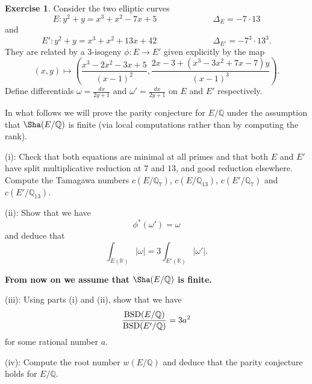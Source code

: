 \documentclass[12pt]{amsart}
\numberwithin{equation}{section}
\theoremstyle{remark}
\theoremstyle{definition}
\theoremstyle{definition}
\theoremstyle{definition}
\theoremstyle{definition}
\theoremstyle{definition}
\theoremstyle{definition}
\newtheorem{exercise}[equation]{Exercise}
\theoremstyle{definition}
\begin{document}
\begin{exercise}
Consider the two elliptic curves
\[E:y^2+y=x^3+x^2-7x+5~~~~~~\phantom{howdoyoudo}\Delta_E=-7\cdot 13\]
and
\[E':y^2+y=x^3+x^2+13x+42~~~~~~\phantom{howdoyoudo}\Delta_{E'}=-7^3\cdot 13^3.\]
They are related by a $3$-isogeny $\phi:E\rightarrow E'$ given explicitly by the map
\[(x,y)\mapsto \left(\frac{x^3-2x^2-3x+5}{(x-1)^2},\frac{2x-3+(x^3-3x^2+7x-7)y}{(x-1)^3}\right).\]
Define differentials $\omega=\frac{dx}{2y+1}$ and $\omega'=\frac{dx}{2y+1}$ on $E$ and $E'$ respectively. 

In what follows we will prove the parity conjecture for $E/\mathbb{Q}$ under the assumption that $\Sha(E/\mathbb{Q})$ is finite (via  local computations rather than by computing the rank). 

(i): Check that both equations are minimal at all primes and that both $E$ and $E'$ have split multiplicative reduction at $7$ and $13$, and good reduction elsewhere. Compute the Tamagawa numbers $c(E/\mathbb{Q}_7)$, $c(E/\mathbb{Q}_{13})$, $c(E'/\mathbb{Q}_7)$ and $c(E'/\mathbb{Q}_{13})$. 



(ii): Show that we have
\[\phi^*(\omega')=\omega\]
and deduce that
\[\int_{E(\mathbb{R})}|\omega|=3\int_{E'(\mathbb{R})}|\omega'|.\]

\bigskip
\textbf{From now on we assume that} $\Sha(E/\mathbb{Q})$ \textbf{is finite.}
\bigskip

(iii): Using parts (i) and (ii), show that we have
\[\frac{\textup{BSD}(E/\mathbb{Q})}{\textup{BSD}(E'/\mathbb{Q})}=3a^2\]
for some rational number $a$. 

(iv): Compute the root number $w(E/\mathbb{Q})$ and deduce that the parity conjecture holds for $E/\mathbb{Q}$. 
\end{exercise}
\end{document}

